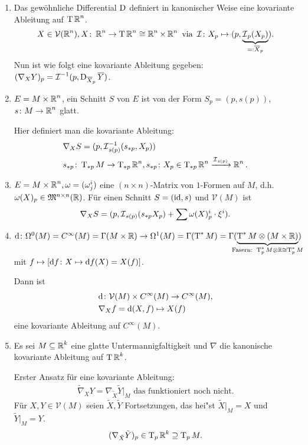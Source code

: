 \begin{bsp}\begin{enumerate}[label=\arabic*),leftmargin=*]
\item
	Das gewöhnliche Differential $\operatorname{D}$ definiert in kanonischer Weise eine kovariante Ableitung auf $\operatorname{T}\operatorname{\mathbb{R}}^n$.
	\begin{align*}
		X \in \mathcal V(\operatorname{\mathbb{R}}^n), X \colon \operatorname{\mathbb{R}}^n \to \operatorname{T}\operatorname{\mathbb{R}}^n \cong \operatorname{\mathbb{R}}^n \times \operatorname{\mathbb{R}}^n \text{ via } \operatorname{\mathcal{I}}\colon X_p \mapsto (p,\underbrace{\operatorname{\mathcal{I}}_p(X_p)}_{=:\overline X_p}).
	\end{align*}
	Nun ist wie folgt eine kovariante Ableitung gegeben: $(\nabla_XY)_p = \operatorname{\mathcal{I}}^{-1}(p,\operatorname{D}_{\overline X_p}\overline Y)$.
\item
	$E = M \times \operatorname{\mathbb{R}}^n$, ein Schnitt $S$ von $E$ ist von der Form $S_p = (p,s(p))$, $s \colon M \to \operatorname{\mathbb{R}}^n$ glatt.

	Hier definiert man die kovariante Ableitung:
	\begin{align*}
		& \nabla_XS = (p,\operatorname{\mathcal{I}}_{s(p)}^{-1}(s_{*p},X_p))\\
		&  s_{*p}\colon \operatorname{T}_{*p}M \to \operatorname{T}_{*p}\operatorname{\mathbb{R}}^n, s_{*p}\colon X_p \in \operatorname{T}_{*p}\operatorname{\mathbb{R}}^n \xrightarrow{\operatorname{\mathcal{I}}_{s(p)}} \operatorname{\mathbb{R}}^n.
	\end{align*}
\item
	$E = M \times \operatorname{\mathbb{R}}^n, \omega = (\omega_j^i)$ eine $(n\times n)$-Matrix
	von $1$-Formen auf $M$, d.h. $\omega(X)_p \in \mathfrak M^{n\times n}(\operatorname{\mathbb{R}})$.
	Für einen Schnitt $S = (\operatorname{id}, s)$ und $\mathcal V(M)$ ist 
	\begin{align*}
		\nabla_XS = (p,\operatorname{\mathcal{I}}_{s(p)}(s_{*p}X_p) + \sum \omega(X)_p^i\cdot \xi^i).
	\end{align*}
\item
	$\dop \colon \Omega^0(M) = C^{\infty}(M) = \Gamma(M\times \R) \to \Omega^1(M) = \Gamma(\T^{*}M) = \Gamma(\underbrace{\T^{*}M \otimes (M \times \R)}_{\mathclap{\text{Fasern: } \T_p^{*}M\otimes\R \cong \T_p^{*}M}})$ mit $f \mapsto [\mathrm{d} f \colon X \mapsto \mathrm{d} f(X) = X(f)]$.

	Dann ist
	\begin{align*}
		& \mathrm{d} \colon \mathcal V(M) \times C^{\infty}(M) \to C^{\infty}(M),\\
		& \nabla_Xf = \mathrm{d} (X,f) \mapsto X(f)
	\end{align*}
	eine kovariante Ableitung auf $C^{\infty}(M)$.
\item
	Es sei $M \subseteq \operatorname{\mathbb{R}}^k$ eine glatte Untermannigfaltigkeit und $\nabla$ die kanonische kovariante Ableitung auf $\operatorname{T} \operatorname{\mathbb{R}}^k$.

	Erster Ansatz für eine kovariante Ableitung:
	\begin{align*}
		\tilde \nabla_XY = \nabla_{\tilde X}\tilde Y|_M \text{ das funktioniert noch nicht.}
	\end{align*}
	Für $X,Y \in \mathcal V(M)$ seien $\tilde X, \tilde Y$ Fortsetzungen, das hei"st $\tilde X|_M = X$ und $\tilde Y|_M = Y$.
	\begin{align*}
		(\nabla_{\tilde X}\tilde Y)_p \in \operatorname{T}_p\operatorname{\mathbb{R}}^k \supseteq \operatorname{T}_pM.
	\end{align*}


\end{enumerate}
\end{bsp}
